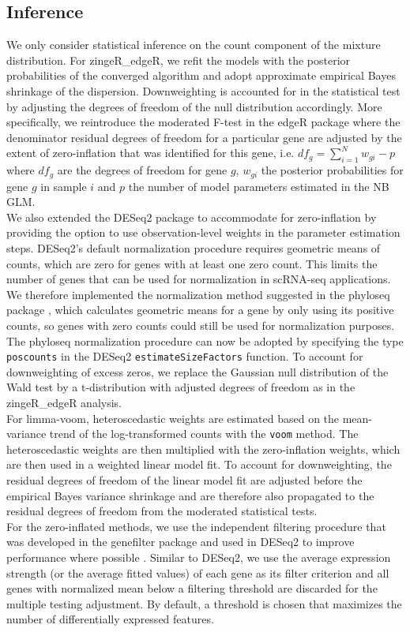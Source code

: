 \documentclass{bmcart}
\begin{document}
\subsection*{Inference}
We only consider statistical inference on the count component of the mixture distribution.
For zingeR\_edgeR, we refit the models with the posterior probabilities of the converged algorithm and adopt approximate empirical Bayes shrinkage of the dispersion. 
Downweighting is accounted for in the statistical test by adjusting the degrees of freedom of the null distribution accordingly.
More specifically, we reintroduce the moderated F-test in the edgeR package where the denominator residual degrees of freedom for a particular gene are adjusted by the extent of zero-inflation that was identified for this gene, i.e. $df_g=\sum_{i=1}^N w_{gi} - p$ where $df_g$ are the degrees of freedom for gene $g$, $w_{gi}$ the posterior probabilities for gene $g$ in sample $i$ and $p$ the number of model parameters estimated in the NB GLM.\\
We also extended the DESeq2 package to accommodate for zero-inflation by providing the option to use observation-level weights in the parameter estimation steps. DESeq2's default normalization procedure requires geometric means of counts, which are zero for genes with at least one zero count. This limits the number of genes that can be used for  normalization in scRNA-seq applications. We therefore implemented the normalization method suggested in the phyloseq package \cite{McMurdie2013}, which calculates geometric means for a gene by only using its positive counts, so genes with zero counts could still be used for normalization purposes. The phyloseq normalization procedure can now be adopted by specifying the type \texttt{poscounts} in the DESeq2 \texttt{estimateSizeFactors} function.
To account for downweighting of excess zeros, we replace the Gaussian null distribution of the Wald test by a t-distribution with  adjusted degrees of freedom as in the zingeR\_edgeR analysis.\\
For limma-voom, heteroscedastic weights are estimated based on the mean-variance trend of the log-transformed counts with the \texttt{voom} method. 
The heteroscedastic weights are then multiplied with the zero-inflation weights, which are then used in a weighted linear model fit.
To account for downweighting, the residual degrees of freedom of the linear model fit are adjusted before the empirical Bayes variance shrinkage and are therefore also propagated to the residual degrees of freedom from the moderated statistical tests.\\
For the zero-inflated methods, we use the independent filtering procedure that was developed in the genefilter package and used in DESeq2 \cite{Love2014} to improve performance where possible \cite{Bourgon2010}.
Similar to DESeq2, we use the average expression strength (or the average fitted values) of each gene as its filter criterion and all genes with normalized mean below a filtering threshold are discarded for the multiple testing adjustment.
By default, a threshold is chosen that maximizes the number of differentially expressed features.
\end{document}
